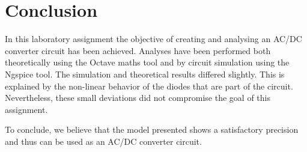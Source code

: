 \section{Conclusion}
\label{sec:conclusion}

In this laboratory assignment the objective of creating and analysing an AC/DC converter circuit has been achieved. Analyses have been performed both theoretically using the Octave maths tool and by circuit simulation using the Ngspice tool. The simulation and theoretical results differed slightly. This is explained by the non-linear behavior of the diodes that are part of the circuit. Nevertheless, these small deviations did not compromise the goal of this assignment. 

To conclude, we believe that the model presented shows a satisfactory precision and thus can be used as an AC/DC converter circuit. 









